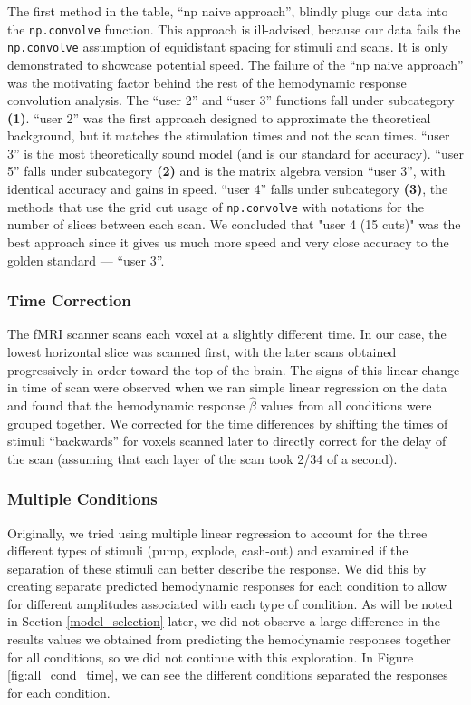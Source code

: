 \par \noindent The first method in the table, ``np naive approach'', blindly 
plugs our data into the \texttt{np.convolve} function. This approach is 
ill-advised, because our data fails the \texttt{np.convolve} assumption of 
equidistant spacing for stimuli and scans. It is only demonstrated to showcase 
potential speed. The failure of the ``np naive approach'' was the motivating 
factor behind the rest of the hemodynamic response convolution analysis. The 
``user 2'' and ``user 3'' functions fall under subcategory \textbf{(1)}. 
``user 2'' was the first approach designed to approximate the theoretical 
background, but it matches the stimulation times and not the scan times.
``user 3'' is the most theoretically sound model (and is our standard for 
accuracy). ``user 5'' falls under subcategory \textbf{(2)} and is the matrix 
algebra version ``user 3'', with identical accuracy and gains in speed. 
``user 4'' falls under subcategory \textbf{(3)}, the methods that use the
grid cut usage of \texttt{np.convolve} with notations for the number of slices 
between each scan. We concluded that "user 4 (15 cuts)" was the best approach 
since it gives us much more speed and very close accuracy to the golden 
standard --- ``user 3''.

\subsubsection{Time Correction}

\par \indent The fMRI scanner scans each voxel at a slightly different time. 
In our case, the lowest horizontal slice was scanned first, with the later 
scans obtained progressively in order toward the top of the brain. The signs 
of this linear change in time of scan were observed when we ran simple linear 
regression on the data and found that the hemodynamic response $\hat{\beta}$ 
values from all conditions were grouped together. We corrected for the time 
differences by shifting the times of stimuli ``backwards'' for voxels scanned 
later to directly correct for the delay of the scan (assuming that each layer 
of the scan took 2/34 of a second).

\subsubsection{Multiple Conditions}

\par \indent Originally, we tried using multiple linear regression to account 
for the three different types of stimuli (pump, explode, cash-out) and 
examined if the separation of these stimuli can better describe the response. 
We did this by creating separate predicted hemodynamic responses for each 
condition to allow for different amplitudes associated with each type of 
condition. As will be noted in Section \ref{model_selection} later, we did 
not observe a large difference in the results values we obtained from 
predicting the hemodynamic responses together for all conditions, so we did 
not continue with this exploration. In Figure \ref{fig:all_cond_time}, we can 
see the different conditions separated the responses for each condition.
 


